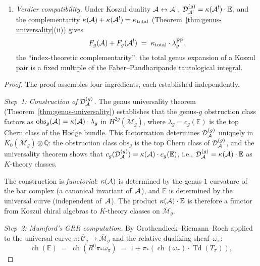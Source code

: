 \begin{theorem}
\begin{enumerate}[label=\textup{(\roman*)}]
\item \emph{Verdier compatibility.}
Under Koszul duality $\mathcal{A} \leftrightarrow \mathcal{A}^!$,
$\mathcal{D}_{\mathcal{A}^!}^{(g)} = \kappa(\mathcal{A}^!) \cdot \mathbb{E}$,
and the complementarity
$\kappa(\mathcal{A}) + \kappa(\mathcal{A}^!) = \kappa_{\mathrm{total}}$
\textup{(}Theorem~\textup{\ref{thm:genus-universality}(ii))}
gives
\[
F_g(\mathcal{A}) + F_g(\mathcal{A}^!)
\;=\;
\kappa_{\mathrm{total}} \cdot \lambda_g^{\mathrm{FP}},
\]
the ``index-theoretic complementarity'': the total genus expansion
of a Koszul pair is a fixed multiple of the
Faber--Pandharipande tautological integral.
\end{enumerate}
\end{theorem}

\begin{proof}
The proof assembles four ingredients, each established
independently.

\emph{Step~1: Construction of $\mathcal{D}_{\mathcal{A}}^{(g)}$.}
The genus universality theorem
(Theorem~\ref{thm:genus-universality}) establishes that the
genus-$g$ obstruction class factors as
$\mathrm{obs}_g(\mathcal{A}) = \kappa(\mathcal{A}) \cdot \lambda_g$ in
$H^{2g}(\overline{\mathcal{M}}_g)$, where
$\lambda_g = c_g(\mathbb{E})$ is the top Chern class of the
Hodge bundle.  This factorization determines
$\mathcal{D}_{\mathcal{A}}^{(g)}$ uniquely in
$K_0(\overline{\mathcal{M}}_g) \otimes \mathbb{Q}$:
the obstruction class $\mathrm{obs}_g$ is the top Chern class of
$\mathcal{D}_{\mathcal{A}}^{(g)}$, and the universality theorem
shows that $c_g(\mathcal{D}_{\mathcal{A}}^{(g)}) =
\kappa(\mathcal{A}) \cdot c_g(\mathbb{E})$, i.e.,
$\mathcal{D}_{\mathcal{A}}^{(g)} = \kappa(\mathcal{A}) \cdot \mathbb{E}$
as $K$-theory classes.

The construction is \emph{functorial}: $\kappa(\mathcal{A})$ is
determined by the genus-$1$ curvature of the bar complex
(a canonical invariant of~$\mathcal{A}$), and $\mathbb{E}$ is determined
by the universal curve (independent of~$\mathcal{A}$).  The product
$\kappa(\mathcal{A}) \cdot \mathbb{E}$ is therefore a functor from
Koszul chiral algebras to $K$-theory classes on
$\overline{\mathcal{M}}_g$.

\emph{Step~2: Mumford's GRR computation.}
By Grothendieck--Riemann--Roch applied to the universal curve
$\pi \colon \overline{\mathcal{C}}_g \to \overline{\mathcal{M}}_g$
and the relative dualizing sheaf~$\omega_\pi$:
\begin{equation}\label{eq:mumford-grr}
\operatorname{ch}(\mathbb{E})
\;=\;
\operatorname{ch}(R^0\pi_*\omega_\pi)
\;=\;
1 + \pi_*\!\left(
  \operatorname{ch}(\omega_\pi) \cdot
  \operatorname{Td}(T_\pi)
\right),
\end{equation}


\end{proof}
